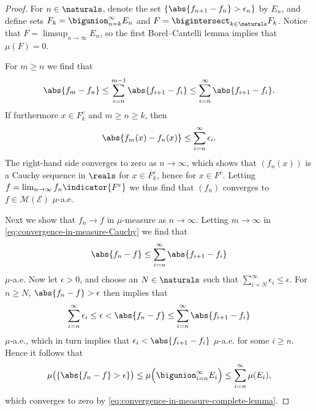 \documentclass[article, a4paper, 11pt, oneside]{memoir}
\numberwithin{equation}{chapter}
\newcommand{\calE}{\mathcal{E}}
\newcommand{\measurable}{\mathcal{M}}
\begin{document}
\begin{proof}
    For $n \in \naturals$, denote the set $\{ \abs{f_{n+1} - f_n} > \epsilon_n \}$ by $E_n$, and define sets $F_k = \bigunion_{n=k}^\infty E_n$ and $F = \bigintersect_{k\in\naturals} F_k$. Notice that $F = \limsup_{n\to\infty} E_n$, so the first Borel--Cantelli lemma implies that $\mu(F) = 0$.
    
    For $m \geq n$ we find that
    \begin{equation}
        \label{eq:convergence-in-measure-Cauchy}
        \abs{ f_m - f_n }
            \leq \sum_{i=n}^{m-1} \abs{f_{i+1} - f_i}
            \leq \sum_{i=n}^\infty \abs{f_{i+1} - f_i}.
    \end{equation}
    If furthermore $x \in F_k^c$ and $m \geq n \geq k$, then
    \begin{equation*}
        \abs{ f_m(x) - f_n(x) }
            \leq \sum_{i=n}^\infty \epsilon_i.
    \end{equation*}
    The right-hand side converges to zero as $n \to \infty$, which shows that $(f_n(x))$ is a Cauchy sequence in $\reals$ for $x \in F_k^c$, hence for $x \in F^c$. Letting $f = \lim_{n\to\infty} f_n \indicator{F^c}$ we thus find that $(f_n)$ converges to $f \in \measurable(\calE)$ $\mu$-a.e.

    Next we show that $f_n \to f$ in $\mu$-measure as $n \to \infty$. Letting $m \to \infty$ in \cref{eq:convergence-in-measure-Cauchy} we find that
    \begin{equation*}
        \abs{ f_n - f }
        \leq \sum_{i=n}^\infty \abs{f_{i+1} - f_i}
    \end{equation*}
    $\mu$-a.e. Now let $\epsilon > 0$, and choose an $N \in \naturals$ such that $\sum_{i=N}^\infty \epsilon_i \leq \epsilon$. For $n \geq N$, $\abs{f_n - f} > \epsilon$ then implies that
    \begin{equation*}
        \sum_{i=n}^\infty \epsilon_i
            \leq \epsilon
            < \abs{f_n - f}
            \leq \sum_{i=n}^\infty \abs{f_{i+1} - f_i}
    \end{equation*}
    $\mu$-a.e., which in turn implies that $\epsilon_i < \abs{f_{i+1} - f_i}$ $\mu$-a.e. for some $i \geq n$. Hence it follows that
    \begin{equation*}
        \mu\bigl( \{ \abs{f_n - f} > \epsilon \}\bigr)
            \leq \mu \Bigl( \bigunion_{i=n}^\infty E_i \Bigr)
            \leq \sum_{i=n}^\infty \mu(E_i),
    \end{equation*}
    which converges to zero by \cref{eq:convergence-in-measure-complete-lemma}.
\end{proof}
\end{document}
